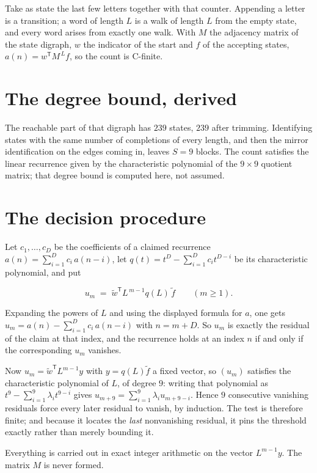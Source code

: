 \documentclass[11pt]{article}
\theoremstyle{definition}
\begin{document}
Take as state the last few letters together with that counter. Appending a letter is a transition; a word of length $L$ is a walk of length $L$ from the empty state, and every word arises from exactly one walk. With $M$ the adjacency matrix of the state digraph, $w$ the indicator of the start and $f$ of the accepting states, $a(n) = w^{\mathsf T}M^{\,L}f$, so the count is C-finite.

\section{The degree bound, derived}

The reachable part of that digraph has $239$ states, $239$ after trimming. Identifying states with the same number of completions of every length, and then the mirror identification on the edges coming in, leaves $S = 9$ blocks. The count satisfies the linear recurrence given by the characteristic polynomial of the $9\times9$ quotient matrix; that degree bound is computed here, not assumed.

\section{The decision procedure}

Let $c_1,\dots,c_D$ be the coefficients of a claimed recurrence $a(n) = \sum_{i=1}^{D} c_i\,a(n-i)$, let $q(t) = t^{D} - \sum_{i=1}^{D} c_i t^{D-i}$ be its characteristic polynomial, and put

\[u_m \;=\; \tilde w^{\mathsf T} L^{\,m-1} q(L)\,\tilde f \qquad (m \ge 1).\]

Expanding the powers of $L$ and using the displayed formula for $a$, one gets $u_m = a(n) - \sum_{i=1}^{D} c_i\,a(n-i)$ with $n = m + D$. So $u_m$ is exactly the residual of the claim at that index, and the recurrence holds at an index $n$ if and only if the corresponding $u_m$ vanishes.

Now $u_m = \tilde w^{\mathsf T} L^{m-1} y$ with $y = q(L)\tilde f$ a fixed vector, so $(u_m)$ satisfies the characteristic polynomial of $L$, of degree $9$: writing that polynomial as $t^{9} - \sum_{i=1}^{9} \lambda_i t^{9-i}$ gives $u_{m+9} = \sum_{i=1}^{9} \lambda_i u_{m+9-i}$. Hence $9$ consecutive vanishing residuals force every later residual to vanish, by induction. The test is therefore finite; and because it locates the {\itshape last} nonvanishing residual, it pins the threshold exactly rather than merely bounding it.

Everything is carried out in exact integer arithmetic on the vector $L^{m-1}y$. The matrix $M$ is never formed.
\end{document}
